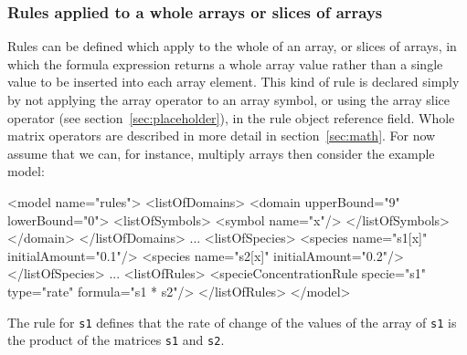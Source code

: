 \documentclass{cekarticle}
\begin{document}
\subsubsection{Rules applied to a whole arrays or slices of arrays}

Rules can be defined which apply to the whole of an array, or
slices of arrays, in which the formula expression returns a whole
array value rather than a single value to be inserted into each
array element.  This kind of rule is declared simply by not
applying the array operator to an array symbol, or using the array
slice operator (see section~\ref{sec:placeholder}), in the rule
object reference field.  Whole matrix operators are described in
more detail in section~\ref{sec:math}.  For now assume that we
can, for instance, multiply arrays then consider the example
model:

\begin{example}
<model name="rules">
    <listOfDomains>
        <domain upperBound="9" lowerBound="0">
            <listOfSymbols>
                <symbol name="x"/>
            </listOfSymbols>
        </domain>
    </listOfDomains>
    ...
    <listOfSpecies>
        <species name="s1[x]" initialAmount="0.1"/>
        <species name="s2[x]" initialAmount="0.2"/>
    </listOfSpecies>
    ...
    <listOfRules>
        <specieConcentrationRule specie="s1" type="rate" formula="s1 * s2"/>
    </listOfRules>
</model>
\end{example}

The rule for \texttt{s1} defines that the rate of change of the
values of the array of \texttt{s1} is the product of the matrices
\texttt{s1} and \texttt{s2}.
\end{document}
